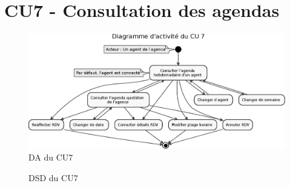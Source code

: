\clearpage
\section{CU7 - Consultation des agendas}
\begin{figure}[H]
\centering
\includegraphics[width=20cm, angle=90]{figures/eps/DA_CU7.eps}
\caption{DA du CU7}
\end{figure}


\begin{figure}[H]
\noindent{}
\caption{DSD du CU7}
\end{figure}

